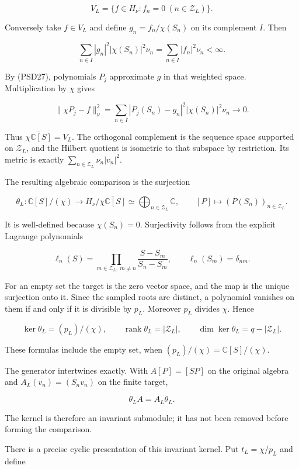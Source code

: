 \[
V_L=\{f\in H_\nu:f_n=0\ (n\in\mathcal Z_L)\}.
\]

Conversely take \(f \in V_L\) and define \(g_n=f_n/\chi(S_n)\) on its complement \(I\). Then

\[
\sum_{n\in I}|g_n|^2|\chi(S_n)|^2\nu_n
=\sum_{n\in I}|f_n|^2\nu_n<\infty.
\]

By (PSD27), polynomials \(P_j\) approximate \(g\) in that weighted space. Multiplication by \(\chi\) gives

\[
\|\chi P_j-f\|_\nu^2
=\sum_{n\in I}|P_j(S_n)-g_n|^2|\chi(S_n)|^2\nu_n\longrightarrow0.
\tag{PSD29}
\]

Thus \(\overline{\chi\mathbb{C}[S]}=V_L\). The orthogonal complement is the sequence space supported on \(\mathcal Z_L\), and the Hilbert quotient is isometric to that subspace by restriction. Its metric is exactly \(\sum_{n\in\mathcal Z_L}\nu_n|v_n|^2\).

The resulting algebraic comparison is the surjection

\[
\theta_L:\mathbb{C}[S]/(\chi)\longrightarrow
H_\nu/\overline{\chi\mathbb{C}[S]}
\simeq\bigoplus_{n\in\mathcal Z_L}\mathbb{C},
\qquad [P]\longmapsto(P(S_n))_{n\in\mathcal Z_L}.
\tag{PSD30}
\]

It is well-defined because \(\chi(S_n)=0\). Surjectivity follows from the explicit Lagrange polynomials

\[
\ell_n(S)=\prod_{m\in\mathcal Z_L,\ m\ne n}\frac{S-S_m}{S_n-S_m},
\qquad \ell_n(S_m)=\delta_{nm}.
\tag{PSD31}
\]

For an empty set the target is the zero vector space, and the map is the unique surjection onto it. Since the sampled roots are distinct, a polynomial vanishes on them if and only if it is divisible by \(p_L\). Moreover \(p_L\) divides \(\chi\). Hence

\[
\ker\theta_L=(p_L)/(\chi),\qquad
\operatorname{rank}\theta_L=|\mathcal Z_L|,\qquad
\dim\ker\theta_L=q-|\mathcal Z_L|.
\tag{PSD32}
\]

These formulas include the empty set, when \((p_L)/(\chi)=\mathbb{C}[S]/(\chi)\).

The generator intertwines exactly. With \(A[P]=[SP]\) on the original algebra and \(A_L(v_n)=(S_nv_n)\) on the finite target,

\[
\theta_LA=A_L\theta_L.
\tag{PSD33}
\]

The kernel is therefore an invariant submodule; it has not been removed before forming the comparison.

There is a precise cyclic presentation of this invariant kernel. Put \(t_L=\chi/p_L\) and define

